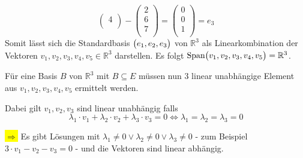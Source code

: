 \documentclass{scrreprt}
\begin{document}
\begin{enumerate}[(a)]
\[\begin{pmatrix}
      4 \\
    \end{pmatrix} -
    \begin{pmatrix}
      2 \\
      6 \\
      7 \\
    \end{pmatrix}
    = \begin{pmatrix}
      0 \\
      0 \\
      1 \\
    \end{pmatrix} = e_3
  \]
  Somit lässt sich die Standardbasis $\qty\big(e_1, e_2, e_3)$ von $\mathbb{R}^3$
  als Linearkombination der Vektoren $v_1, v_2, v_3, v_4, v_5 \in \mathbb{R}^3$
  darstellen.
  Es folgt
  $\text{Span}\qty\big(v_1, v_2, v_3, v_4, v_5) = \mathbb{R}^3$.

  Für eine Basis $B$ von $\mathbb{R}^3$ mit $B \subseteq E$ müssen nun 3 linear
  unabhängige Element aus $v_1, v_2, v_3, v_4, v_5$ ermittelt werden.

  Dabei gilt $v_1, v_2, v_3$ sind linear unabhängig falls
  \[
    \lambda_1 \cdot v_1 + \lambda_2 \cdot v_2 + \lambda_3 \cdot v_3 = 0 \iff \lambda_1 = \lambda_2 = \lambda_3 = 0
  \]

  \colorbox{yellow}{$\Rightarrow$} Es gibt Lösungen mit
  $\lambda_1 \ne 0 \lor \lambda_2 \ne 0 \lor \lambda_3 \ne 0$ - zum Beispiel
  $3 \cdot v_1 - v_2 - v_3 = 0$ - und die Vektoren sind linear abhängig.


\end{enumerate}
\end{document}
